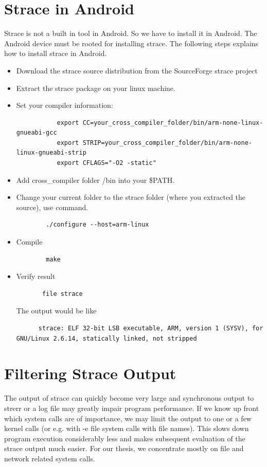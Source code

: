 \documentclass[12pt]{report}
\begin{document}
\section{Strace in Android}
Strace is not a built in tool in Android. So we have to install it in Android. The Android device must be rooted for installing strace. The following steps explains how to install strace in Android.
\begin{itemize}
	\item Download the strace source distribution from the SourceForge strace project
	\item Extract the strace package on your linux machine.
	\item Set your compiler information:
    \begin{lstlisting}
           export CC=your_cross_compiler_folder/bin/arm-none-linux-gnueabi-gcc
           export STRIP=your_cross_compiler_folder/bin/arm-none-linux-gnueabi-strip
           export CFLAGS="-O2 -static"
    \end{lstlisting}
    
    \item Add cross\_compiler folder /bin into your \$PATH.
     \item Change your current folder to the strace folder (where you extracted the source), use command.
     
     \begin{lstlisting}
        ./configure --host=arm-linux
     \end{lstlisting}
     
    \item Compile
    \begin{lstlisting}
        make
    \end{lstlisting}
    \item Verify result
	\begin{lstlisting}
	   file strace
	\end{lstlisting}
	The output would be like
	\begin{lstlisting}
	  strace: ELF 32-bit LSB executable, ARM, version 1 (SYSV), for GNU/Linux 2.6.14, statically linked, not stripped
	\end{lstlisting}
\end{itemize}

\section{Filtering Strace Output}
	The output of
	strace
	can quickly become very large and synchronous output to
	strerr
	or a log file may
	greatly impair program performance. If we know up front which system calls are of importance, we
	may limit the output to one or a few kernel calls (or e.g. with
	-e file
	system calls with file names). This
	slows down program execution considerably less and makes subsequent evaluation of the
	strace	output	much easier. For our thesis, we concentrate mostly on file and network related system calls.
	
\end{document}

